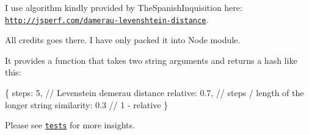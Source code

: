 \href{https://nodei.co/npm/damerau-levenshtein/}{\tt }

I use algorithm kindly provided by The\+Spanish\+Inquisition here\+: \href{http://jsperf.com/damerau-levenshtein-distance}{\tt http\+://jsperf.\+com/damerau-\/levenshtein-\/distance}.

All credits goes there. I have only packed it into Node module.

It provides a function that takes two string arguments and returns a hash like this\+:


\begin{DoxyCode}
\{
  steps: 5,       // Levenstein demerau distance
  relative: 0.7,  // steps / length of the longer string
  similarity: 0.3 // 1 - relative
\}
\end{DoxyCode}


Please see \href{./test/test.js}{\tt tests} for more insights. 